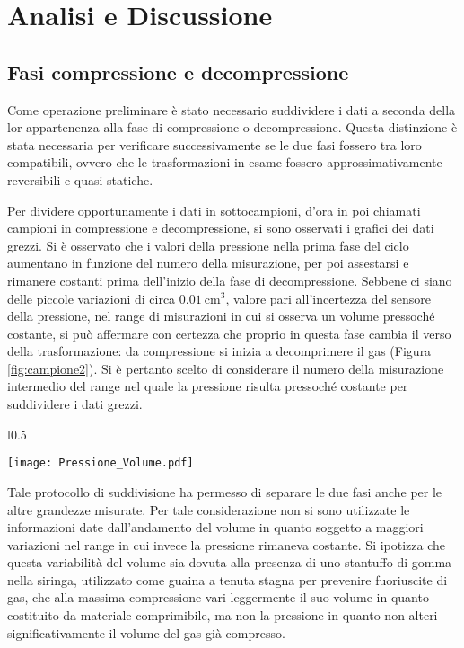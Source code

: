 \documentclass[a4paper,11pt,oneside]{article}
\begin{document}
\section{Analisi e Discussione}
\subsection{Fasi compressione e decompressione}\label{par:compress}
Come operazione preliminare è stato necessario suddividere i dati a seconda della lor appartenenza alla fase di compressione o decompressione. Questa distinzione è stata necessaria per verificare successivamente se le due fasi fossero tra loro compatibili, ovvero che le trasformazioni in esame fossero approssimativamente reversibili e quasi statiche.

Per dividere opportunamente i dati in sottocampioni, d'ora in poi chiamati campioni in compressione e decompressione, si sono osservati i grafici dei dati grezzi. Si è osservato che i valori della pressione nella prima fase del ciclo aumentano in funzione del numero della misurazione, per poi assestarsi e rimanere costanti prima dell'inizio della fase di decompressione. Sebbene ci siano delle piccole variazioni di circa $\SI{0.01}{\centi\meter\cubed}$, valore pari all'incertezza del sensore della pressione,  nel range di misurazioni in cui si osserva un volume pressoché costante, si può affermare con certezza che proprio in questa fase cambia il verso della trasformazione: da compressione si inizia a decomprimere il gas (Figura \ref{fig:campione2}). Si è pertanto scelto di considerare il numero della misurazione intermedio del range nel quale la pressione risulta pressoché costante per suddividere i dati grezzi.
\begin{wrapfigure}{l}{0.5\textwidth}
  \begin{center}
    \texttt{[image: Pressione\_Volume.pdf]}
  \end{center}
  \caption{Pressioni e Volumi Primo Campione}
  \label{fig:campione2}
\end{wrapfigure}

Tale protocollo di suddivisione ha permesso di separare le due fasi anche per le altre grandezze misurate. Per tale considerazione non si sono utilizzate le informazioni date dall'andamento del volume in quanto soggetto a maggiori variazioni nel range in cui invece la pressione rimaneva costante. Si ipotizza che questa variabilità del volume sia dovuta alla presenza di uno stantuffo di gomma nella siringa, utilizzato come guaina a tenuta stagna per prevenire fuoriuscite di gas, che alla massima compressione vari leggermente il suo volume in quanto costituito da materiale comprimibile, ma non la pressione in quanto non alteri significativamente il volume del gas già compresso.
\end{document}

